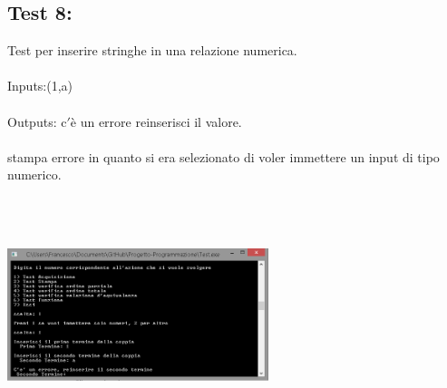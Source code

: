\documentclass[11pt, a4paper, titlepage, block]{article}
\begin{document}
	\subsection{Test 8:}
	Test per inserire stringhe in una relazione numerica.\\
	\\
	Inputs:(1,a)\\
	\\
	Outputs: c$'$\`e un errore reinserisci il valore.\\
	\\
	stampa errore in quanto si era selezionato di voler immettere un input di tipo numerico.\\
	\includegraphics[width=3in,height=3in,viewport=0 0 300 300]{../Screenshots/Test8Input.png}
	\\
	\\
	\newpage
\end{document}
